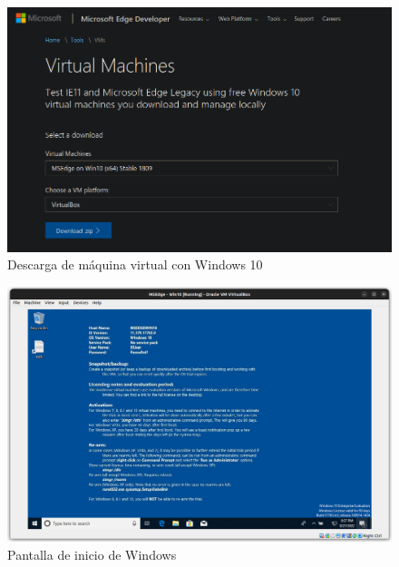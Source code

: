\documentclass{article}
\begin{document}
        \begin{figure}[!htbp]
            \centering
            \includegraphics[scale=0.3]{img/win-download.png}
            \caption{Descarga de máquina virtual con Windows 10}
            \label{fig:windows-download}
        \end{figure}

        \begin{figure}[!htbp]
            \centering
            \includegraphics[scale=0.2]{img/windows-init.png}
            \caption{Pantalla de inicio de Windows}
            \label{fig:windows-init}
        \end{figure}
\end{document}
